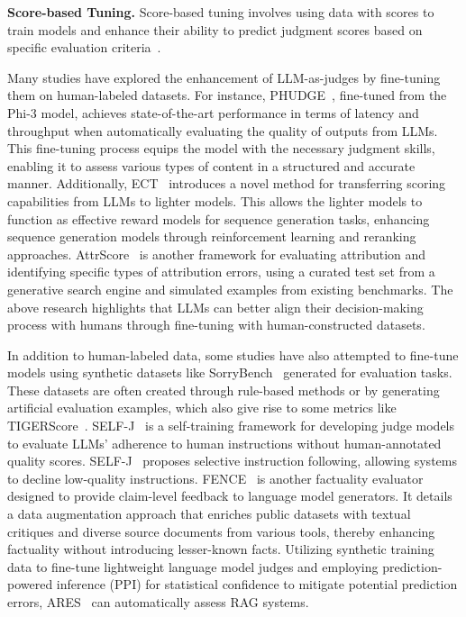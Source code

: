 \textbf{Score-based Tuning.} Score-based tuning involves using data with scores to train models and enhance their ability to predict judgment scores based on specific evaluation criteria~\cite{chen2023adaptation,deshwal2024phudge,wang2023learning}.


Many studies have explored the enhancement of LLM-as-judges by fine-tuning them on human-labeled datasets. 
For instance, PHUDGE~\cite{deshwal2024phudge}, fine-tuned from the Phi-3 model, achieves state-of-the-art performance in terms of latency and throughput when automatically evaluating the quality of outputs from LLMs. This fine-tuning process equips the model with the necessary judgment skills, enabling it to assess various types of content in a structured and accurate manner.
Additionally, ECT~\cite{wang2023learning} introduces a novel method for transferring scoring capabilities from LLMs to lighter models. This allows the lighter models to function as effective reward models for sequence generation tasks, enhancing sequence generation models through reinforcement learning and reranking approaches.
AttrScore~\cite{yue2023automatic} is another framework for evaluating attribution and identifying specific types of attribution errors, using a curated test set from a generative search engine and simulated examples from existing benchmarks.
The above research highlights that LLMs can better align their decision-making process with humans through fine-tuning with human-constructed datasets.

In addition to human-labeled data, some studies have also attempted to fine-tune models using synthetic datasets like SorryBench~\cite{xie2024sorry} generated for evaluation tasks. These datasets are often created through rule-based methods or by generating artificial evaluation examples, which also give rise to some metrics like TIGERScore~\cite{jiang2023tigerscore}.
SELF-J~\cite{ye2024self} is a self-training framework for developing judge models to evaluate LLMs' adherence to human instructions without human-annotated quality scores. SELF-J~\cite{ye2024self} proposes selective instruction following, allowing systems to decline low-quality instructions.
FENCE~\cite{xie2024improving} is another factuality evaluator designed to provide claim-level feedback to language model generators. It details a data augmentation approach that enriches public datasets with textual critiques and diverse source documents from various tools, thereby enhancing factuality without introducing lesser-known facts.
Utilizing synthetic training data to fine-tune lightweight language model judges and employing prediction-powered inference (PPI) for statistical confidence to mitigate potential prediction errors, ARES~\cite{saad2023ares} can automatically assess RAG systems.


